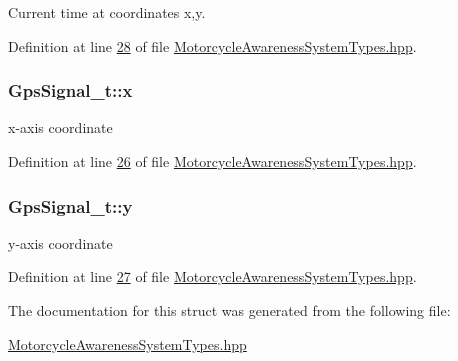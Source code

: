 Current time at coordinates x,y. 



Definition at line \hyperlink{MotorcycleAwarenessSystemTypes_8hpp_source_l00028}{28} of file \hyperlink{MotorcycleAwarenessSystemTypes_8hpp_source}{Motorcycle\-Awareness\-System\-Types.\-hpp}.

\hypertarget{structGpsSignal__t_a6f7bd3c500b55923ab335ada4b6b26eb}{
\subsubsection[{x}]{ Gps\-Signal\-\_\-t\-::x}}\label{structGpsSignal__t_a6f7bd3c500b55923ab335ada4b6b26eb}


x-\/axis coordinate 



Definition at line \hyperlink{MotorcycleAwarenessSystemTypes_8hpp_source_l00026}{26} of file \hyperlink{MotorcycleAwarenessSystemTypes_8hpp_source}{Motorcycle\-Awareness\-System\-Types.\-hpp}.

\hypertarget{structGpsSignal__t_ab9e083be189fc842ed7aa4fdc978e94e}{
\subsubsection[{y}]{ Gps\-Signal\-\_\-t\-::y}}\label{structGpsSignal__t_ab9e083be189fc842ed7aa4fdc978e94e}


y-\/axis coordinate 



Definition at line \hyperlink{MotorcycleAwarenessSystemTypes_8hpp_source_l00027}{27} of file \hyperlink{MotorcycleAwarenessSystemTypes_8hpp_source}{Motorcycle\-Awareness\-System\-Types.\-hpp}.



The documentation for this struct was generated from the following file\-:\begin{DoxyCompactItemize}
\item 
\hyperlink{MotorcycleAwarenessSystemTypes_8hpp}{Motorcycle\-Awareness\-System\-Types.\-hpp}\end{DoxyCompactItemize}
